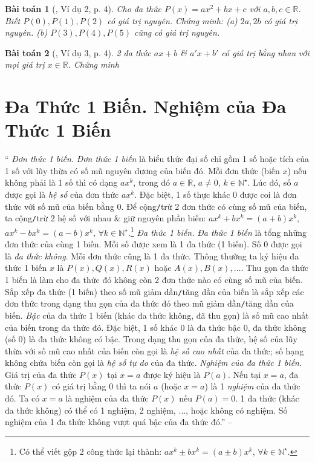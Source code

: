 \documentclass{article}
\numberwithin{equation}{section}
\newtheorem{baitoan}{Bài toán}
\begin{document}
\begin{baitoan}[\cite{Binh_Toan_7_tap_2}, Ví dụ 2, p. 4]
	Cho đa thức $P(x) = ax^2 + bx + c$ với $a,b,c\in\mathbb{R}$. Biết $P(0),P(1),P(2)$ có giá trị nguyên. Chứng minh: (a) $2a,2b$ có giá trị nguyên. (b) $P(3),P(4),P(5)$ cũng có giá trị nguyên.
\end{baitoan}

\begin{baitoan}[\cite{Binh_Toan_7_tap_2}, Ví dụ 3, p. 4]
	2 đa thức $ax + b$ \& $a'x + b'$ có giá trị bằng nhau với mọi giá trị $x\in\mathbb{R}$. Chứng minh 
\end{baitoan}



\section{Đa Thức 1 Biến. Nghiệm của Đa Thức 1 Biến}
`` \textit{Đơn thức 1 biến.} \textit{Đơn thức 1 biến} là biểu thức đại số chỉ gồm 1 số hoặc tích của 1 số với lũy thừa có số mũ nguyên dương của biến đó. Mỗi đơn thức (biến $x$) nếu không phải là 1 số thì có dạng $ax^k$, trong đó $a\in\mathbb{R}$, $a\ne0$, $k\in\mathbb{N}^\star$. Lúc đó, số $a$ được gọi là \textit{hệ số} của đơn thức $ax^k$. Đặc biệt, 1 số thực khác $0$ được coi là đơn thức với số mũ của biến bằng $0$. Để cộng\texttt{/}trừ 2 đơn thức có cùng số mũ của biến, ta cộng\texttt{/}trừ 2 hệ số với nhau \& giữ nguyên phần biến: $ax^k + bx^k = (a + b)x^k$, $ax^k - bx^k = (a - b)x^k$, $\forall k\in\mathbb{N}^\star$.\footnote{Có thể viết gộp 2 công thức lại thành: $ax^k\pm bx^k = (a\pm b)x^k$, $\forall k\in\mathbb{N}^\star$.}  \textit{Đa thức 1 biến.} \textit{Đa thức 1 biến} là tổng những đơn thức của cùng 1 biến. Mỗi số được xem là 1 đa thức (1 biến). Số $0$ được gọi là \textit{đa thức không}. Mỗi đơn thức cũng là 1 đa thức. Thông thường ta ký hiệu đa thức 1 biến $x$ là $P(x),Q(x),R(x)$ hoặc $A(x),B(x),\ldots$. Thu gọn đa thức 1 biến là làm cho đa thức đó không còn 2 đơn thức nào có cùng số mũ của biến. Sắp xếp đa thức (1 biến) theo số mũ giảm dần\texttt{/}tăng dần của biến là sắp xếp các đơn thức trong dạng thu gọn của đa thức đó theo mũ giảm dần\texttt{/}tăng dần của biến. \textit{Bậc} của đa thức 1 biến (khác đa thức không, đã thu gọn) là số mũ cao nhất của biến trong đa thức đó. Đặc biệt, 1 số khác 0 là đa thức bậc 0, đa thức không (số 0) là đa thức không có bậc. Trong dạng thu gọn của đa thức, hệ số của lũy thừa với số mũ cao nhất của biến còn gọi là \textit{hệ số cao nhất} của đa thức; số hạng không chứa biến còn gọi là \textit{hệ số tự do} của đa thức.  \textit{Nghiệm của đa thức 1 biến.} Giá trị của đa thức $P(x)$ tại $x = a$ được ký hiệu là $P(a)$. Nếu tại $x = a$, đa thức $P(x)$ có giá trị bằng $0$ thì ta nói $a$ (hoặc $x = a$) là 1 \textit{nghiệm} của đa thức đó. Ta có $x = a$ là nghiệm của đa thức $P(x)$ nếu $P(a) = 0$. 1 đa thức (khác đa thức không) có thể có 1 nghiệm, 2 nghiệm, $\ldots$, hoặc không có nghiệm. Số nghiệm của 1 đa thức không vượt quá bậc của đa thức đó.'' -- \cite[Chap. VI, \S2, pp. 40--41]{SBT_Toan_7_Canh_Dieu_tap_2}
\end{document}
